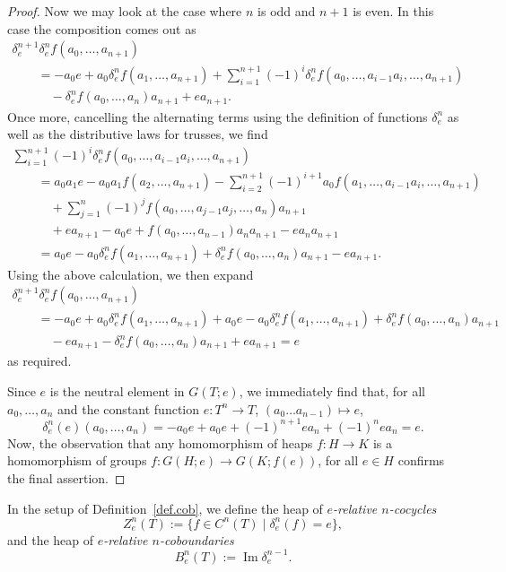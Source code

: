 \documentclass[10pt,a4paper]{amsart}
\numberwithin{equation}{section}
\newcommand{\im}{\operatorname{Im}}
\begin{document}
\begin{proof}
 Now we may look at the case where $n$ is odd and $n+1$ is even.
In this case the composition comes out as
\begin{gather*}
 \delta^{n+1}_e\delta^{n}_e f(a_0,\dots,a_{n+1})\\
 \qquad{} = - a_0 e + a_0 \delta^n_e f (a_1,\dots,a_{n+1})  + \sum_{i=1}^{n+1} (-1)^i \delta^n_e f (a_0,\dots,a_{i-1}a_i,\dots,a_{n+1}) \\
\qquad\quad{} - \delta^n_e f(a_0,\dots,a_n)a_{n+1} + ea_{n+1}.
 \end{gather*}
Once more, cancelling the alternating terms using the definition of functions $\delta^n_e$ as well as the distributive laws for trusses, we find
\begin{gather*}
  \sum_{i=1}^{n+1} (-1)^i \delta^n_e f (a_0,\dots,a_{i-1}a_i,\dots,a_{n+1}) \\
  \qquad{}= a_0 a_1 e - a_0 a_1 f(a_2,\dots,a_{n+1})
 - \sum_{i=2}^{n+1}(-1)^{i+1}a_0 f(a_1,\dots,a_{i-1}a_i,\dots,a_{n+1}) \\
\qquad\quad{} + \sum_{j=1}^n (-1)^j f(a_0,\dots,a_{j-1}a_j,\dots,a_n)a_{n+1} \\
 \qquad\quad{} + e a_{n+1} -a_0 e
 + f (a_0,\dots,a_{n-1})a_n a_{n+1} -  ea_n a_{n+1} \\
\qquad{} = a_0e - a_0\delta^n_e f (a_1,\dots,a_{n+1})+ \delta^n_e f (a_0,\dots,a_{n})a_{n+1} - ea_{n+1}.
\end{gather*}
Using the above calculation, we then expand
\begin{gather*}
\delta^{n+1}_e \delta^{n}_e f(a_0,\dots,a_{n+1})\\
\qquad{}  =
- a_0 e + a_0 \delta^n_e f (a_1,\dots,a_{n+1}) + a_0e - a_0\delta^n_e f (a_1,\dots,a_{n+1})+ \delta^n_e f (a_0,\dots,a_{n})a_{n+1}\\
\qquad\quad{}- ea_{n+1}  - \delta^n_e f(a_0,\dots,a_n)a_{n+1} + ea_{n+1} = e
\end{gather*}
as required.

Since $e$ is the neutral element in $G(T;e)$, we immediately find that, for all $a_0,\dots, a_n$ and the constant function $e\colon T^n\to T$, $(a_0\dots a_{n-1})\mapsto e$,
\[
\delta_e^n(e)(a_0,\dots, a_n) = -a_0e +a_0e +(-1)^{n+1}ea_n + (-1)^n ea_n = e.
\]
Now, the observation that any homomorphism of heaps $f\colon H\to K$ is a homomorphism of groups $f\colon G(H;e)\to G(K;f(e))$, for all $e\in H$ confirms the final assertion.
\end{proof}



\begin{Definition}\label{def.cob.coc}
 In the setup of Definition~\ref{def.cob}, we define the heap of {\em $e$-relative $n$-cocycles}
 \[
 Z^n_e(T) := \{f\in C^{n}(T)\; |\; \delta_e^n(f) =e\},
 \]
 and the heap of {\em $e$-relative $n$-coboundaries}
 \[
 B^n_e(T):= \im \delta_e^{n-1}.
 \]
\end{Definition}
\end{document}

